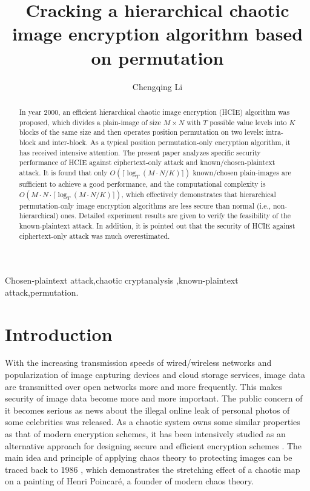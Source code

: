 \documentclass[final,3p,times,twocolumn]{elsarticle}
\begin{document}
\begin{frontmatter}

\title{Cracking a hierarchical chaotic image encryption algorithm based on permutation}


\author{Chengqing Li}



\address{College of Information Engineering, Xiangtan University, Xiangtan 411105, Hunan, China}


\begin{abstract}
In year 2000, an efficient hierarchical chaotic image encryption (HCIE) algorithm was proposed, which divides a plain-image
of size $M\times N$ with $T$ possible value levels into $K$ blocks of the same size and then operates position permutation on two levels: intra-block and inter-block. As a typical position permutation-only encryption algorithm, it has received intensive attention. The present paper analyzes specific security performance of HCIE against ciphertext-only attack and known/chosen-plaintext attack. It is found that only $O(\lceil\log_T(M\cdot N/K) \rceil)$ known/chosen plain-images are sufficient to achieve a good performance, and
the computational complexity is $O(M\cdot N\cdot \lceil\log_T(M\cdot N/K) \rceil)$, which effectively demonstrates that hierarchical permutation-only image
encryption algorithms are less secure than normal (i.e., non-hierarchical) ones. Detailed experiment results are given to verify the feasibility of the known-plaintext attack. In addition, it is pointed out that the security of HCIE against ciphertext-only attack was much overestimated.
\end{abstract}
\begin{keyword}
Chosen-plaintext attack\sep chaotic cryptanalysis \sep known-plaintext attack\sep permutation.
\end{keyword}
\end{frontmatter}

\section{Introduction}

With the increasing transmission speeds of wired/wireless networks and popularization of image capturing devices and cloud storage
services, image data are transmitted over open networks more and more frequently. This makes security of image data become
more and more important. The public concern of it becomes serious as news about the illegal online leak of personal photos of some celebrities was released.
As a chaotic system owns some similar properties as that of modern encryption schemes, it has been intensively studied as an alternative approach for designing
secure and efficient encryption schemes \cite{Li:Dissertation2003,YaobinMao:CSF2004,AlvarezLi:Rules:IJBC2006}. The main idea and principle of applying chaos theory to protecting images can be traced back to 1986 \cite{Crutchfield:Chaos:SA86}, which demonstrates the stretching effect of a chaotic map on a painting of Henri Poincar\'{e}, a founder of modern chaos theory.
\end{document}

